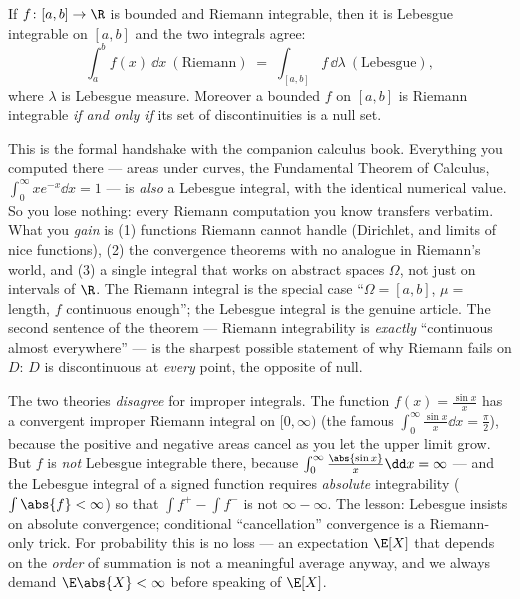 \begin{theorem}
\label{ch37:thm-riemann}
If $f\colon[a,b]\to\R$ is bounded and Riemann integrable, then it is Lebesgue
integrable on $[a,b]$ and the two integrals agree:
\[
  \int_a^b f(x)\,\dd x \ (\text{Riemann}) \;=\; \int_{[a,b]} f\,\dd\lambda
  \ (\text{Lebesgue}),
\]
where $\lambda$ is Lebesgue measure. Moreover a bounded $f$ on $[a,b]$ is
Riemann integrable \emph{if and only if} its set of discontinuities is a null
set.
\end{theorem}

\begin{connectionbox}
This is the formal handshake with the companion calculus book. Everything you
computed there --- areas under curves, the Fundamental Theorem of Calculus,
$\int_0^\infty x e^{-x}\dd x = 1$ --- is \emph{also} a Lebesgue integral, with
the identical numerical value. So you lose nothing: every Riemann computation you
know transfers verbatim. What you \emph{gain} is (1) functions Riemann cannot
handle (Dirichlet, and limits of nice functions), (2) the convergence theorems
with no analogue in Riemann's world, and (3) a single integral that works on
abstract spaces $\Omega$, not just on intervals of $\R$. The Riemann integral is
the special case ``$\Omega=[a,b]$, $\mu=$ length, $f$ continuous enough''; the
Lebesgue integral is the genuine article. The second sentence of the theorem ---
Riemann integrability is \emph{exactly} ``continuous almost everywhere'' --- is
the sharpest possible statement of why Riemann fails on $D$: $D$ is discontinuous
at \emph{every} point, the opposite of null.
\end{connectionbox}

\begin{trapbox}
The two theories \emph{disagree} for improper integrals. The function
$f(x)=\frac{\sin x}{x}$ has a convergent improper Riemann integral on
$[0,\infty)$ (the famous $\int_0^\infty \frac{\sin x}{x}\dd x = \frac\pi2$),
because the positive and negative areas cancel as you let the upper limit grow.
But $f$ is \emph{not} Lebesgue integrable there, because
$\int_0^\infty \frac{\abs{\sin x}}{x}\dd x = \infty$ --- and the Lebesgue
integral of a signed function requires \emph{absolute} integrability
($\int\abs{f}<\infty$) so that $\int f^+ - \int f^-$ is not $\infty-\infty$. The
lesson: Lebesgue insists on absolute convergence; conditional ``cancellation''
convergence is a Riemann-only trick. For probability this is no loss --- an
expectation $\E[X]$ that depends on the \emph{order} of summation is not a
meaningful average anyway, and we always demand $\E\abs{X}<\infty$ before
speaking of $\E[X]$.
\end{trapbox}

